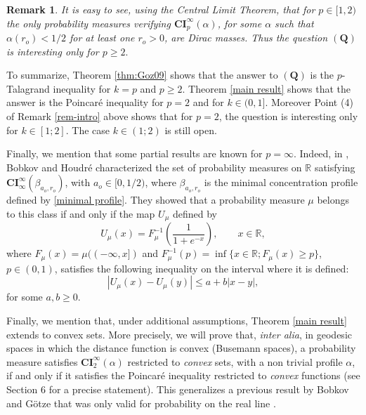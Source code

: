 \documentclass[11pt]{amsart}
\newtheorem{rem}[equation]{Remark}
\numberwithin{equation}{section}
\begin{document}
\begin{rem}
It is easy to see, using the Central Limit Theorem, that for $p\in [1,2)$ the only probability measures verifying $\mathbf{CI}_p^{\infty}(\alpha)$, for some $\alpha$ such that $\alpha(r_o)<1/2$ for at least one $r_o>0$, are Dirac masses. Thus the question $\mathbf{(Q)}$ is interesting only for $p\geq2.$
\end{rem}

To summarize, Theorem \ref{thm:Goz09} shows that the answer to $\mathbf{(Q)}$ is the $p$-Talagrand inequality for $k=p$ and $p\geq2$. Theorem \ref{main result} shows that the answer is the Poincar\'e inequality for $p=2$ and for $k\in (0,1]$. Moreover Point (4) of Remark \ref{rem-intro} above shows that for $p=2$, the question is interesting only for $k\in [1;2].$ The case $k\in (1;2)$ is still open.

Finally, we mention that some partial results are known for $p=\infty$. Indeed, in \cite{BH00}, Bobkov and Houdr\'e characterized the set of probability measures on ${\mathbb{R}}$ satisfying $\mathbf{CI}_\infty^\infty(\beta_{a_o,r_o})$, with $a_o \in [0,1/2)$, where $\beta_{a_o,r_o}$ is the minimal concentration profile defined by \eqref{minimal profile}. They showed that a probability measure $\mu$ belongs to this class if and only if the map $U_\mu$ defined by
\[
U_\mu(x)=F_\mu^{-1}\left(\frac{1}{1+e^{-x}}\right),\qquad x\in {\mathbb{R}},
\]
where $F_\mu(x)=\mu((-\infty,x])$ and $F_\mu^{-1}(p)=\inf\{x\in {\mathbb{R}} ; F_\mu(x)\geq p\}$, $p\in (0,1)$, satisfies the following inequality on the interval where it is defined:
\[
|U_\mu(x)-U_\mu(y)|\leq a+b|x-y|,
\]
for some $a,b\geq0.$

Finally, we mention that, under additional assumptions, Theorem \ref{main result} extends to convex sets. 
More precisely, we will prove that, \textit{inter alia}, in geodesic spaces in which the distance function is convex (Busemann spaces),  a probability measure satisfies $\mathbf{CI}^\infty_2(\alpha)$ restricted to \emph{convex} sets, with a non trivial profile $\alpha$, if and only if it satisfies the Poincar\'e inequality restricted to \emph{convex} functions (see Section 6 for a precise statement).
This generalizes a previous result by Bobkov and G\"otze that was only valid for probability on the real line \cite[Theorem 4.2]{BG99}.
\end{document}
